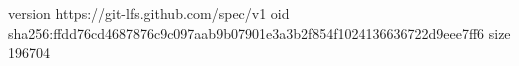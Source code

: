 version https://git-lfs.github.com/spec/v1
oid sha256:ffdd76cd4687876c9c097aab9b07901e3a3b2f854f1024136636722d9eee7ff6
size 196704
